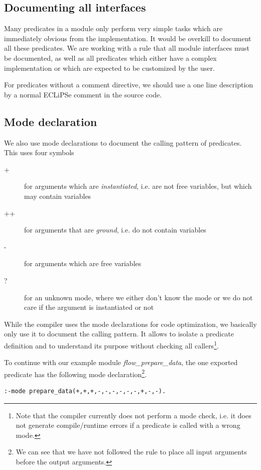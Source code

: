 \documentclass[a4paper,12pt]{report}
\begin{document}
\subsection{Documenting all interfaces}
Many predicates in a module only perform very simple tasks which are immediately obvious from the implementation. It would be overkill to document all these predicates. We are working with a rule that all module interfaces must be documented, as well as all predicates which either have a complex implementation or which are expected to be customized by the user.

For predicates without a comment directive, we should use a one line description by a normal ECLiPSe comment in the source code. 

\subsection{Mode declaration}
We also use mode declarations to document the calling pattern of predicates. This uses four symbols
\begin{description}
\item[+] for arguments which are {\it instantiated}, i.e. are not free variables, but which may contain variables
\item[++] for arguments that are {\it ground}, i.e. do not contain variables
\item[-] for arguments which are free variables
\item[?] for an unknown mode, where we either don't know the mode or we do not care if the argument is instantiated or not
\end{description}
While the compiler uses the mode declarations for code optimization, we basically only use it to document the calling pattern. It allows to isolate a predicate definition and to understand its purpose without checking all callers\footnote{Note that the compiler currently does not perform a mode check, i.e. it does not generate compile/runtime errors if a predicate is called with a wrong mode.}.

To continue with our example module {\it flow\_prepare\_data}, the one exported predicate has the following mode declaration\footnote{We can see that we have not followed the rule to place all input arguments before the output arguments.}.
\begin{verbatim}
:-mode prepare_data(+,+,+,-,-,-,-,-,-,+,-,-).
\end{verbatim}
\end{document}
